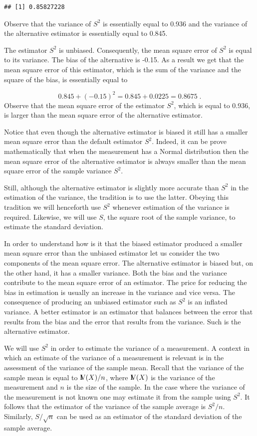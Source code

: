 \documentclass[]{krantz}
\newcommand{\Var}{{\rm I\kern-.3em V}}
\theoremstyle{definition}
\theoremstyle{definition}
\theoremstyle{definition}
\theoremstyle{remark}
\begin{document}
\begin{verbatim}
## [1] 0.85827228
\end{verbatim}

Observe that the variance of \(S^2\) is essentially equal to 0.936 and the
variance of the alternative estimator is essentially equal to 0.845.

The estimator \(S^2\) is unbiased. Consequently, the mean square error of
\(S^2\) is equal to its variance. The bias of the alternative is -0.15. As
a result we get that the mean square error of this estimator, which is
the sum of the variance and the square of the bias, is essentially equal
to

\[0.845 + (-0.15)^2 = 0.845 + 0.0225 = 0.8675\;.\] Observe that the
mean square error of the estimator \(S^2\), which is equal to 0.936, is
larger than the mean square error of the alternative estimator.

Notice that even though the alternative estimator is biased it still has
a smaller mean square error than the default estimator \(S^2\). Indeed, it
can be prove mathematically that when the measurement has a Normal
distribution then the mean square error of the alternative estimator is
always smaller than the mean square error of the sample variance \(S^2\).

Still, although the alternative estimator is slightly more accurate than
\(S^2\) in the estimation of the variance, the tradition is to use the
latter. Obeying this tradition we will henceforth use \(S^2\) whenever
estimation of the variance is required. Likewise, we will use \(S\), the
square root of the sample variance, to estimate the standard deviation.

In order to understand how is it that the biased estimator produced a
smaller mean square error than the unbiased estimator let us consider
the two components of the mean square error. The alternative estimator
is biased but, on the other hand, it has a smaller variance. Both the
bias and the variance contribute to the mean square error of an
estimator. The price for reducing the bias in estimation is usually an
increase in the variance and vice versa. The consequence of producing an
unbiased estimator such as \(S^2\) is an inflated variance. A better
estimator is an estimator that balances between the error that results
from the bias and the error that results from the variance. Such is the
alternative estimator.

We will use \(S^2\) in order to estimate the variance of a measurement. A
context in which an estimate of the variance of a measurement is
relevant is in the assessment of the variance of the sample mean. Recall
that the variance of the sample mean is equal to \(\Var(X)/n\), where
\(\Var(X)\) is the variance of the measurement and \(n\) is the size of the
sample. In the case where the variance of the measurement is not known
one may estimate it from the sample using \(S^2\). It follows that the
estimator of the variance of the sample average is \(S^2/n\). Similarly,
\(S/\sqrt{n}\) can be used as an estimator of the standard deviation of
the sample average.
\end{document}
